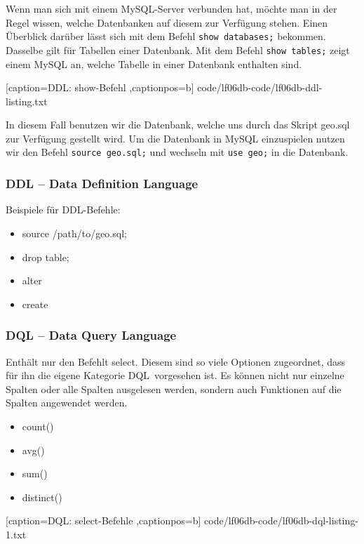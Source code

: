 Wenn man sich mit einem MySQL-Server verbunden hat, möchte man in der Regel wissen, welche Datenbanken auf diesem zur Verfügung stehen. Einen Überblick darüber lässt sich mit dem Befehl \texttt{show databases;} bekommen. Dasselbe gilt für Tabellen einer Datenbank. Mit dem Befehl \texttt{show tables;} zeigt einem MySQL an, welche Tabelle in einer Datenbank enthalten sind.


	[caption={DDL: show-Befehl}
	\label{lst:ddl-show},captionpos=b]
	{code/lf06db-code/lf06db-ddl-listing.txt}

In diesem Fall benutzen wir die Datenbank, welche uns durch das Skript geo.sql zur Verfügung gestellt wird. Um die Datenbank in MySQL einzuspielen nutzen wir den Befehl \texttt{source geo.sql;} und wechseln mit \texttt{use geo;} in die Datenbank.

\subsubsection{DDL -- Data Definition Language}
Beispiele für DDL-Befehle:

	\begin{itemize}
		\item source /path/to/geo.sql;
		\item drop table;
		\item alter
		\item create
	\end{itemize}

\subsubsection{DQL -- Data Query Language}
Enthält nur den Befehlt \ql select\qr. Diesem sind so viele Optionen zugeordnet, dass für ihn die eigene Kategorie \ql DQL\qr\ vorgesehen ist. Es können nicht nur einzelne Spalten oder alle Spalten ausgelesen werden, sondern auch Funktionen auf die Spalten angewendet werden.

\begin{itemize}
	\item count()
	\item avg()
	\item sum()
	\item distinct()
\end{itemize}


	[caption={DQL: select-Befehle}
	\label{lst:dql-select},captionpos=b]
	{code/lf06db-code/lf06db-dql-listing-1.txt}

